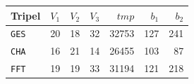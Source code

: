 \begin{center}
\footnotesize
\setlength{\tabcolsep}{6pt}
\renewcommand{\arraystretch}{1.15}
\begin{tabular}{l|rrr|r|rr}
\toprule
\textbf{Tripel} & $V_1$ & $V_2$ & $V_3$ & $\mathit{tmp}$ & $b_1$ & $b_2$ \\
\midrule
\texttt{GES} & 20 & 18 & 32 & 32753 & 127 & 241 \\
\texttt{CHA} & 16 & 21 & 14 & 26455 & 103 & 87 \\
\texttt{FFT} & 19 & 19 & 33 & 31194 & 121 & 218 \\
\bottomrule
\end{tabular}
\end{center}
